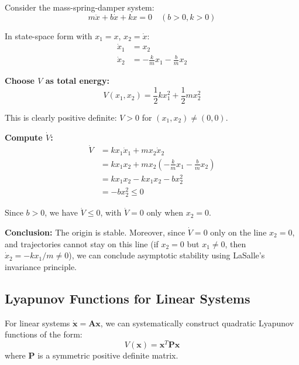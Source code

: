 \begin{example}
\label{ex:lyapunov_msd}
Consider the mass-spring-damper system:
\begin{equation}
m\ddot{x} + b\dot{x} + kx = 0 \quad (b > 0, k > 0)
\end{equation}

In state-space form with $x_1 = x$, $x_2 = \dot{x}$:
\begin{align}
\dot{x}_1 &= x_2 \\
\dot{x}_2 &= -\frac{k}{m}x_1 - \frac{b}{m}x_2
\end{align}

\textbf{Choose $V$ as total energy:}
\begin{equation}
V(x_1, x_2) = \frac{1}{2}kx_1^2 + \frac{1}{2}mx_2^2
\end{equation}

This is clearly positive definite: $V > 0$ for $(x_1, x_2) \neq (0, 0)$.

\textbf{Compute $\dot{V}$:}
\begin{align}
\dot{V} &= kx_1\dot{x}_1 + mx_2\dot{x}_2 \\
&= kx_1 x_2 + mx_2\left(-\frac{k}{m}x_1 - \frac{b}{m}x_2\right) \\
&= kx_1 x_2 - kx_1 x_2 - bx_2^2 \\
&= -bx_2^2 \leq 0
\end{align}

Since $b > 0$, we have $\dot{V} \leq 0$, with $\dot{V} = 0$ only when $x_2 = 0$.

\textbf{Conclusion:} The origin is stable. Moreover, since $\dot{V} = 0$ only on the line $x_2 = 0$, and trajectories cannot stay on this line (if $x_2 = 0$ but $x_1 \neq 0$, then $\dot{x}_2 = -kx_1/m \neq 0$), we can conclude asymptotic stability using LaSalle's invariance principle.
\end{example}

\subsection{Lyapunov Functions for Linear Systems}

For linear systems $\dot{\mathbf{x}} = \mathbf{A}\mathbf{x}$, we can systematically construct quadratic Lyapunov functions of the form:
\begin{equation}
V(\mathbf{x}) = \mathbf{x}^T \mathbf{P} \mathbf{x}
\end{equation}
where $\mathbf{P}$ is a symmetric positive definite matrix.

